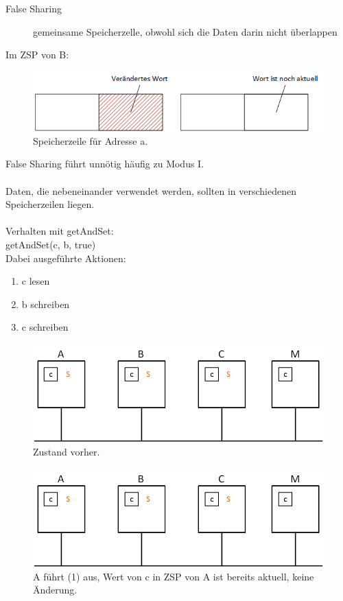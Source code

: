 \begin{description}
	\item[False Sharing] gemeinsame Speicherzelle, obwohl sich die Daten darin nicht überlappen
\end{description}

Im ZSP von B:
\begin{figure}[H]
	\begin{center}
		\includegraphics[width=.5\textwidth]{res/false_sharing_01}
		\caption{Speicherzeile für Adresse a.}
		\label{pic:falsesharing}
	\end{center}
\end{figure} 
False Sharing führt unnötig häufig zu Modus I.\\
\\
Daten, die nebeneinander verwendet werden, sollten in verschiedenen Speicherzeilen liegen.\\
\\
Verhalten mit getAndSet:\\
getAndSet(c, b, true)\\
Dabei ausgeführte Aktionen:
\begin{enumerate}
	\item c lesen
	\item b schreiben
	\item c schreiben
\end{enumerate}
\begin{figure}[H]
	\begin{center}
		\includegraphics[width=.5\textwidth]{res/mesi_05}
		\caption{Zustand vorher.}
		\label{pic:mesi05}
	\end{center}
\end{figure} 
\begin{figure}[H]
	\begin{center}
		\includegraphics[width=.5\textwidth]{res/mesi_06}
		\caption{A führt (1) aus, Wert von c in ZSP von A ist bereits aktuell, keine Änderung.}
		\label{pic:mesi06}
	\end{center}
\end{figure} 
